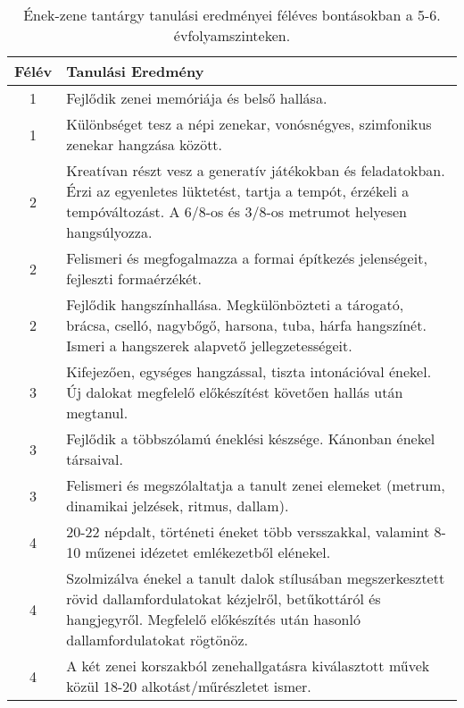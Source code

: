        
           \begin{longtable}{c | p{} }
            \caption[Ének-zene 5-6.]{Ének-zene tantárgy tanulási eredményei féléves bontásokban a 5-6. évfolyamszinteken. }  \\

            \textbf{Félév} & \textbf{Tanulási Eredmény} \\
            \hline
            \endhead
                                
                                          1 &  Fejlődik zenei memóriája és belső hallása. \\ \hline
                                          1 &  Különbséget tesz a népi zenekar, vonósnégyes, szimfonikus zenekar hangzása között. \\ \hline
                                      
                                
                                          2 &  Kreatívan részt vesz a generatív játékokban és feladatokban. Érzi az egyenletes lüktetést, tartja a tempót, érzékeli a tempóváltozást. A 6/8-os és 3/8-os metrumot helyesen hangsúlyozza. \\ \hline
                                          2 &  Felismeri és megfogalmazza a formai építkezés jelenségeit, fejleszti formaérzékét. \\ \hline
                                          2 &  Fejlődik hangszínhallása. Megkülönbözteti a tárogató, brácsa, cselló, nagybőgő, harsona, tuba, hárfa hangszínét. Ismeri a hangszerek alapvető jellegzetességeit. \\ \hline
                                      
                                
                                          3 &  Kifejezően, egységes hangzással, tiszta intonációval énekel. Új dalokat megfelelő előkészítést követően hallás után megtanul. \\ \hline
                                          3 &  Fejlődik a többszólamú éneklési készsége. Kánonban énekel társaival. \\ \hline
                                          3 &  Felismeri és megszólaltatja a tanult zenei elemeket (metrum, dinamikai jelzések, ritmus, dallam). \\ \hline
                                      
                                
                                          4 &  20-22 népdalt, történeti éneket több versszakkal, valamint 8-10 műzenei idézetet emlékezetből elénekel. \\ \hline
                                          4 &  Szolmizálva énekel a tanult dalok stílusában megszerkesztett rövid dallamfordulatokat kézjelről, betűkottáról és hangjegyről. Megfelelő előkészítés után hasonló dallamfordulatokat rögtönöz. \\ \hline
                                          4 &  A két zenei korszakból zenehallgatásra kiválasztott művek közül 18-20 alkotást/műrészletet ismer. \\ \hline
                                      
                        \end{longtable}
            \clearpage

